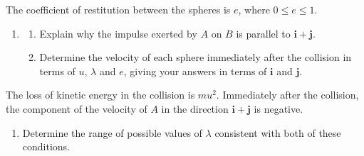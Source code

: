 \documentclass[leqno]{article}
\begin{document}
\begin{enumerate}[
  label=\textbf{\arabic*.},
  leftmargin=*,
  topsep=0pt,
  partopsep=0pt,
  parsep=0pt
]
The coefficient of restitution between the spheres is $e$, where $0\leq e\leq1$. \\
\begin{enumerate}[label=\textbf{(\alph*)}]
\item
\begin{enumerate}[label=(\roman*)]
\item Explain why the impulse exerted by $A$ on $B$ is parallel to $\mathbf{i}+\mathbf{j}$.  \\
\item Determine the velocity of each sphere immediately after the collision in terms of $u$, $\lambda$ and $e$, giving your answers in terms of $\mathbf{i}$ and $\mathbf{j}$.  \\
\end{enumerate}
\end{enumerate}
The loss of kinetic energy in the collision is $mu^2$. Immediately after the collision, the component of the velocity of $A$ in the direction $\mathbf{i}+\mathbf{j}$ is negative. \\
\begin{enumerate}[label=\textbf{(\alph*)}, resume]
\item Determine the range of possible values of $\lambda$ consistent with both of these conditions.  \\
\end{enumerate}

\end{enumerate}
\end{document}
